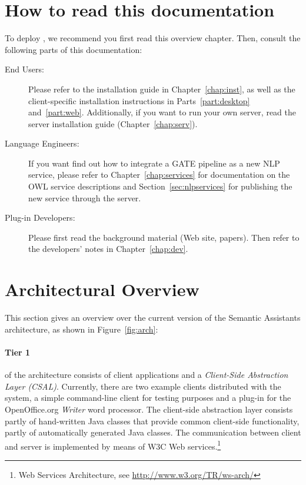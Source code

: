 \section{How to read this documentation}
To deploy \sa, we recommend you first read this overview chapter.
Then, consult the following parts of this documentation:

\begin{description}
\item[End Users:] Please refer to the installation guide in
  Chapter~\ref{chap:inst}, as well as the client-specific installation
  instructions in Parts~\ref{part:desktop}
  and~\ref{part:web}. Additionally, if you want to run your own
  server, read the server installation guide
  (Chapter~\ref{chap:serv}).

\item[Language Engineers:] If you want find out how to integrate a
  GATE pipeline as a new NLP service, please refer to
  Chapter~\ref{chap:services} for documentation on the OWL service
  descriptions and Section~\ref{sec:nlpservices} for publishing the
  new service through the \sa server.

\item[Plug-in Developers:] Please first read the background material
  (Web site, papers). Then refer to the developers' notes in
  Chapter~\ref{chap:dev}.
\end{description}

\section{Architectural Overview}
\label{sec:implementation}
This section gives an overview over the current version of the Semantic
Assistants architecture, as shown in Figure~\ref{fig:arch}:

\paragraph{Tier 1} of the architecture consists of client applications
and a \emph{Client-Side Abstraction Layer (CSAL)}. Currently, there
are two example clients distributed with the system, a simple
command-line client for testing purposes and a plug-in for the
OpenOffice.org \emph{Writer} word processor. The client-side abstraction
layer consists partly of hand-written Java classes that provide
common client-side functionality, partly of automatically generated
Java classes. The communication between client and server is
implemented by means of W3C Web services.\footnote{Web Services Architecture, see
  \url{http://www.w3.org/TR/ws-arch/}} 

